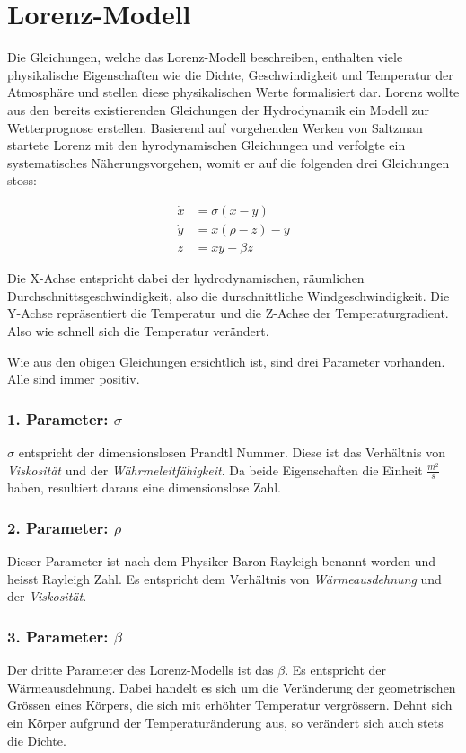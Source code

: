 

\section{Lorenz-Modell}
Die Gleichungen, welche das Lorenz-Modell beschreiben, enthalten viele physikalische Eigenschaften wie die Dichte, Geschwindigkeit und Temperatur der Atmosphäre und stellen diese physikalischen Werte formalisiert dar. Lorenz wollte aus den bereits existierenden Gleichungen der Hydrodynamik ein Modell zur Wetterprognose erstellen. Basierend auf vorgehenden Werken von Saltzman startete Lorenz mit den hyrodynamischen Gleichungen und verfolgte ein systematisches Näherungsvorgehen, womit er auf die folgenden drei Gleichungen stoss:

\begin{align}
\dot{x} &= \sigma(x - y)\\
\dot{y} &= x(\rho - z) - y\\
\dot{z} &= xy - \beta z
\end{align}

Die X-Achse entspricht dabei der hydrodynamischen, räumlichen Durchschnittsgeschwindigkeit, also die durschnittliche Windgeschwindigkeit. Die Y-Achse repräsentiert die Temperatur und die Z-Achse der Temperaturgradient. Also wie schnell sich die Temperatur verändert. 

Wie aus den obigen Gleichungen ersichtlich ist, sind drei Parameter vorhanden. Alle sind immer positiv.

\subsubsection{1. Parameter: $\sigma$}
$\sigma$ entspricht der dimensionslosen Prandtl Nummer. Diese ist das Verhältnis von \textit{Viskosität} und der \textit{Währmeleitfähigkeit}. Da beide Eigenschaften die Einheit $\frac{m^2}{s}$ haben, resultiert daraus eine dimensionslose Zahl.

\subsubsection{2. Parameter: $\rho$}
Dieser Parameter ist nach dem Physiker Baron Rayleigh benannt worden und heisst Rayleigh Zahl. Es entspricht dem Verhältnis von \textit{Wärmeausdehnung} und der \textit{Viskosität}.

\subsubsection{3. Parameter: $\beta$}
Der dritte Parameter des Lorenz-Modells ist das $\beta$. Es entspricht der Wärmeausdehnung. Dabei handelt es sich um die Veränderung der geometrischen Grössen eines Körpers, die sich mit erhöhter Temperatur vergrössern. Dehnt sich ein Körper aufgrund der Temperaturänderung aus, so verändert sich auch stets die Dichte.


